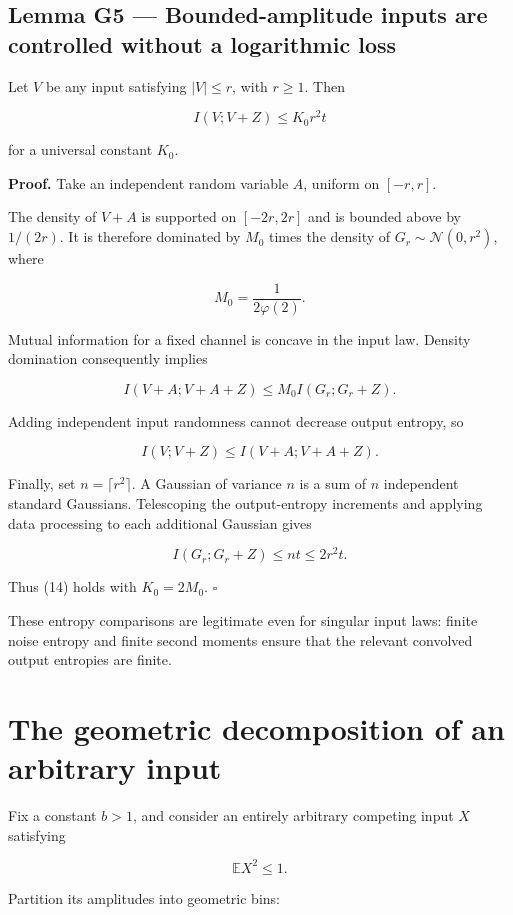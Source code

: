 \documentclass[11pt]{article}
\begin{document}
\subsection{Lemma G5 --- Bounded-amplitude inputs are controlled without a logarithmic loss}

Let \(V\) be any input satisfying \(|V|\leq r\), with \(r\geq1\). Then

\[
\boxed{
I(V;V+Z)\leq K_0r^2t
}
\tag{14}
\]

for a universal constant \(K_0\).

\textbf{Proof.} Take an independent random variable \(A\), uniform on \([-r,r]\).

The density of \(V+A\) is supported on \([-2r,2r]\) and is bounded above by \(1/(2r)\). It is therefore dominated by \(M_0\) times the density of \(G_r\sim\mathcal N(0,r^2)\), where

\[
M_0=\frac1{2\varphi(2)}.
\]

Mutual information for a fixed channel is concave in the input law. Density domination consequently implies

\[
I(V+A;V+A+Z)
\leq M_0 I(G_r;G_r+Z).
\]

Adding independent input randomness cannot decrease output entropy, so

\[
I(V;V+Z)
\leq I(V+A;V+A+Z).
\]

Finally, set \(n=\lceil r^2\rceil\). A Gaussian of variance \(n\) is a sum of \(n\) independent standard Gaussians. Telescoping the output-entropy increments and applying data processing to each additional Gaussian gives

\[
I(G_r;G_r+Z)\leq nt\leq2r^2t.
\]

Thus (14) holds with \(K_0=2M_0\). \(\square\)

These entropy comparisons are legitimate even for singular input laws: finite noise entropy and finite second moments ensure that the relevant convolved output entropies are finite.

\section{The geometric decomposition of an arbitrary input}

Fix a constant \(b>1\), and consider an entirely arbitrary competing input \(X\) satisfying

\[
\mathbb EX^2\leq1.
\]

Partition its amplitudes into geometric bins:
\end{document}

